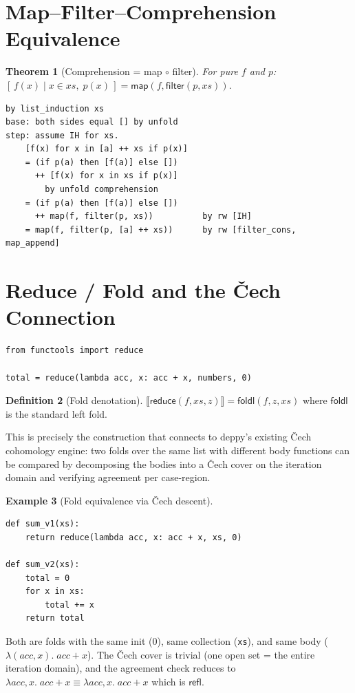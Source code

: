 \documentclass[11pt,a4paper]{report}
\theoremstyle{definition}
\newtheorem{definition}{Definition}[chapter]
\newtheorem{example}[definition]{Example}
\theoremstyle{plain}
\newtheorem{theorem}[definition]{Theorem}
\newcommand{\den}[1]{\llbracket #1 \rrbracket}
\newcommand{\Refl}{\mathsf{refl}}
\begin{document}
\section{Map--Filter--Comprehension Equivalence}

\begin{theorem}[Comprehension = map $\circ$ filter]
\label{thm:comp-map-filter}
For pure $f$ and $p$:
$[\,f(x) \mid x \in \mathit{xs},\; p(x)\,]
  = \mathsf{map}(f, \mathsf{filter}(p, \mathit{xs}))$.
\end{theorem}

\begin{lstlisting}[style=proof]
by list_induction xs
base: both sides equal [] by unfold
step: assume IH for xs.
    [f(x) for x in [a] ++ xs if p(x)]
    = (if p(a) then [f(a)] else [])
      ++ [f(x) for x in xs if p(x)]
        by unfold comprehension
    = (if p(a) then [f(a)] else [])
      ++ map(f, filter(p, xs))          by rw [IH]
    = map(f, filter(p, [a] ++ xs))      by rw [filter_cons, map_append]
\end{lstlisting}

\section{Reduce / Fold and the \v{C}ech Connection}

\begin{lstlisting}[style=python]
from functools import reduce

total = reduce(lambda acc, x: acc + x, numbers, 0)
\end{lstlisting}

\begin{definition}[Fold denotation]
$\den{\mathsf{reduce}(f, \mathit{xs}, z)} = \mathsf{foldl}(f, z, \mathit{xs})$
where $\mathsf{foldl}$ is the standard left fold.
\end{definition}

This is precisely the construction that connects to deppy's existing \v{C}ech
cohomology engine: two folds over the same list with different body functions
can be compared by decomposing the bodies into a \v{C}ech cover on the
iteration domain and verifying agreement per case-region.

\begin{example}[Fold equivalence via \v{C}ech descent]
\begin{lstlisting}[style=python]
def sum_v1(xs):
    return reduce(lambda acc, x: acc + x, xs, 0)

def sum_v2(xs):
    total = 0
    for x in xs:
        total += x
    return total
\end{lstlisting}

Both are folds with the same init ($0$), same collection (\texttt{xs}), and
same body ($\lambda(\mathit{acc}, x).\; \mathit{acc} + x$).  The \v{C}ech
cover is trivial (one open set = the entire iteration domain), and the
agreement check reduces to $\lambda \mathit{acc}, x.\; \mathit{acc} + x
\equiv \lambda \mathit{acc}, x.\; \mathit{acc} + x$ which is $\Refl$.
\end{example}
\end{document}
